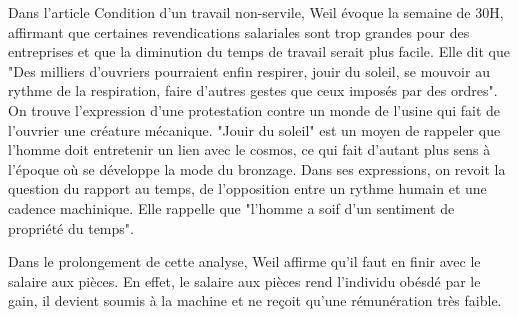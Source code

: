 \documentclass[a4paper,12pt]{book}
\begin{document}
\par Dans l'article Condition d'un travail non-servile, Weil évoque la semaine de 30H, affirmant que certaines revendications salariales sont trop grandes pour des entreprises et que la diminution du temps de travail serait plus facile. Elle dit que "Des milliers d'ouvriers pourraient enfin respirer, jouir du soleil, se mouvoir au rythme de la respiration, faire d'autres gestes que ceux imposés par des ordres". On trouve l'expression d'une protestation contre un monde de l'usine qui fait de l'ouvrier une créature mécanique. "Jouir du soleil" est un moyen de rappeler que l'homme doit entretenir un lien avec le cosmos, ce qui fait d'autant plus sens à l'époque où se développe la mode du bronzage. Dans ses expressions, on revoit la question du rapport au temps, de l'opposition entre un rythme humain et une cadence machinique. Elle rappelle que "l'homme a soif d'un sentiment de propriété du temps".
\par Dans le prolongement de cette analyse, Weil affirme qu'il faut en finir avec le salaire aux pièces. En effet, le salaire aux pièces rend l'individu obésdé par le gain, il devient soumis à la machine et ne reçoit qu'une rémunération très faible.
\end{document}

